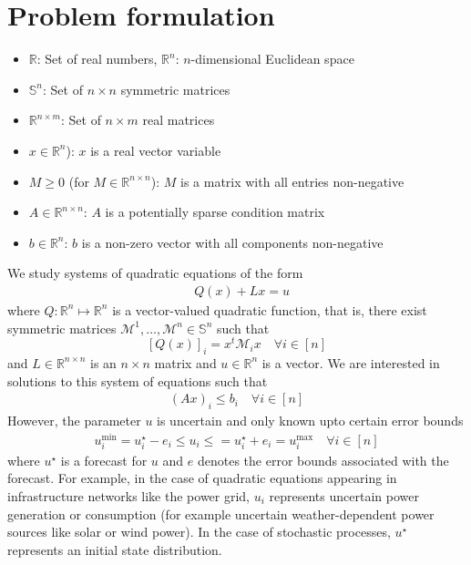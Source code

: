 \documentclass[11pt]{article}
\theoremstyle{plain}
\theoremstyle{definition}
\theoremstyle{remark}
\begin{document}
\section{Problem formulation}

\begin{itemize}
\item[] $\mathbb{R}$: Set of real numbers, $\mathbb{R}^n$: $n$-dimensional Euclidean space 
\item[] $\mathbb{S}^n$: Set of $n \times n$ symmetric matrices 
\item[] $\mathbb{R}^{n \times m}$: Set of $n \times m$ real matrices
\item[] $x \in \mathbb{R}^n$): $x$ is a real vector variable
\item[] $M \geq 0$ (for $M \in \mathbb{R}^{n \times n}$): $M$ is a matrix with all entries non-negative  
\item[] $A \in \mathbb{R}^{n\times n}$: $A$ is a potentially sparse condition matrix
\item[] $b \in \mathbb{R}^n$: $b$ is a non-zero vector with all components non-negative
\end{itemize}

We study systems of quadratic equations of the form
\begin{align}
& Q(x)+Lx=u\label{eq:Quad}
\end{align}
where $Q: \mathbb{R}^n \mapsto \mathbb{R}^n$ is a vector-valued quadratic function, that is, there exist symmetric matrices $\mathcal{M}^1,\ldots,\mathcal{M}^{n} \in \mathbb{S}^n$ such that
\[[Q(x)]_i = x^t \mathcal{M}_{i} x \quad \forall i \in [n]\]
and $L \in \mathbb{R}^{n\times n}$ is an $n \times n$ matrix and $u \in \mathbb{R}^n$ is a vector. We are interested in solutions to this system of equations such that
\begin{align}
(Ax)_i\leq b_i \quad \forall i \in [n]\label{eq:xLimits}
\end{align}
However, the parameter $u$ is uncertain and only known upto certain error bounds
\begin{align}
u^{\min}_i=u_i^\star-e_i \leq u_i \leq =u_i^\star+e_i=u^{\max}_i \quad \forall i \in [n] \label{eq:uLimits}
\end{align}
where $u^\star$ is a forecast for $u$ and $e$ denotes the error bounds associated with the forecast. For example, in the case of quadratic equations appearing in infrastructure networks like the power grid, $u_i$ represents uncertain power generation or consumption (for example uncertain weather-dependent power sources like solar or wind power). In the case of stochastic processes, $u^\star$ represents an initial state distribution.
\end{document}
